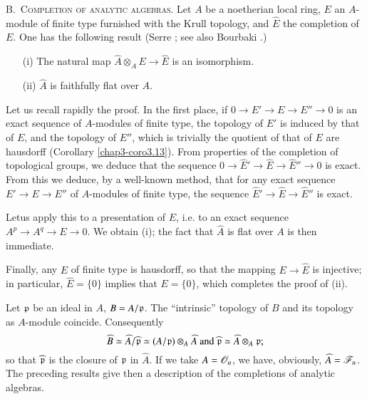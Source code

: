\noindent
B.~\textsc{Completion of analytic algebras.} Let $A$ be a noetherian local ring, $E$ an $A$-module of finite type furnished with the Krull topology, and $\widehat{E}$ the completion of $E$. One has the following result (Serre \cite{J. P. Serre : 1}; see also Bourbaki \cite{N. Bourbaki: 1}.)

\begin{theorem}\label{chap3-thm4.9}
\begin{itemize}
\item[\rm(i)] The natural map $\widehat{A}\otimes_{A}E\to \widehat{E}$ is an isomorphism.

\item[\rm(ii)] $\widehat{A}$ is faithfully flat over $A$.
\end{itemize}
\end{theorem}

Let us recall rapidly the proof. In the first place, if $0\to E'\to E\to E''\to 0$ is an exact sequence of $A$-modules of finite type, the topology of $E'$ is induced by that of $E$, and the topology of $E''$, which is trivially the quotient of that of $E$ are hausdorff (Corollary \ref{chap3-coro3.13}). From properties of the completion of topological groups, we deduce that the sequence $0\to \widehat{E}'\to \widehat{E}\to \widehat{E}''\to 0$ is exact. From this we deduce, by a well-known method, that for any exact sequence $E'\to E\to E''$ of $A$-modules of finite type, the sequence $\widehat{E}'\to \widehat{E}\to \widehat{E}''$ is exact.

Let\pageoriginale us apply this to a presentation of $E$, i.e. to an exact sequence $A^{p}\to A^{q}\to E\to 0$. We obtain (i); the fact that $\widehat{A}$ is flat over $A$ is then immediate.

Finally, any $E$ of finite type is hausdorff, so that the mapping $E\to \widehat{E}$ is injective; in particular, $\widehat{E}=\{0\}$ implies that $E=\{0\}$, which completes the proof of (ii).

Let $\mathfrak{p}$ be an ideal in $A$, $B=A/\mathfrak{p}$. The ``intrinsic'' topology of $B$ and its topology as $A$-module coincide. Consequently 
$$
\widehat{B}\simeq \widehat{A}/\widehat{\mathfrak{p}}\simeq (A/\mathfrak{p})\otimes_{A}\widehat{A}\text{ and } \widehat{\mathfrak{p}}\simeq \widehat{A}\otimes_{A}\mathfrak{p};
$$
so that $\widehat{\mathfrak{p}}$ is the closure of $\mathfrak{p}$ in $\widehat{A}$. If we take $A=\mathscr{O}_{n}$, we have, obviously, $\widehat{A}=\mathscr{F}_{n}$. The preceding results give then a description of the completions of analytic algebras.

